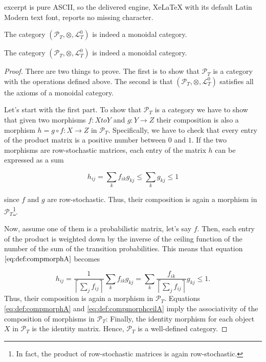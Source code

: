 \documentclass[10pt,a4paper]{amsart}
\renewcommand{\L}{\mathcal{L}}
\renewcommand{\P}{\mathcal{P}}
\begin{document}
excerpt is pure ASCII, so the delivered engine, XeLaTeX with its default Latin Modern text font, reports no missing character.
\begin{theorem}\label{thm:MonoidalCat}
	The category $(\P_{T},\otimes, \L_{T}^{0})$ is indeed a monoidal category.
\end{theorem}

	\begin{theorem}\label{thm:MonoidalCatA}
		The category $(\P_{T},\otimes, \L_{T}^{0})$ is indeed a monoidal category.
	\end{theorem}

	\begin{proof}
		There are two things to prove. The first is to show that $\P_{T}$ is a category with the operations defined above. The second is that $(\P_{T},\otimes, \L_{T}^{0})$ satisfies all the axioms of a monoidal category.
		
		Let's start with the first part. To show that $\P_{T}$ is a category we have to show that given two morphisms $f\colon X to Y$ and $g\colon Y\to Z$ their composition is also a morphism $h = g\circ f\colon X\to Z$ in $\P_{T}$. Specifically, we have to check that every entry of the product matrix is a positive number between $0$ and $1$. If the two morphisms are row-stochastic matrices, each entry of the matrix $h$ can be expressed as a sum
		
		\begin{equation}\label{eq:def:compmorphA}
			h_{ij}=\sum_{k} f_{ik}g_{kj}\leq \sum_{k} g_{kj}\leq 1
		\end{equation}
		
		since $f$ and $g$ are row-stochastic. Thus, their composition is again a morphism in $\P_{T}$\footnote{In fact, the product of row-stochastic matrices is again row-stochastic.}. 
		
		
		Now, assume one of them is a probabilistic matrix, let's say $f$. Then, each entry of the product is weighted down by the inverse of the ceiling function of the number of the sum of the transition probabilities. This means that equation $\eqref{eq:def:compmorphA}$ becomes
		
		\begin{equation}\label{eq:def:compmorphceilA}
			h_{ij}= \frac{1}{\left\lceil\sum_{j}f_{ij}\right\rceil}\sum_{k} f_{ik}g_{kj} = \sum_{k} \frac{f_{ik}}{\left\lceil\sum_{j}f_{ij}\right\rceil} g_{kj}\leq 1.
		\end{equation}
		Thus, their composition is again a morphism in $\P_{T}$. Equations \eqref{eq:def:compmorphA} and \eqref{eq:def:compmorphceilA} imply the associativity of the composition of morphisms in $\P_{T}$: Finally, the identity morphism for each object $X$ in $\P_{T}$ is the identity matrix. Hence, $\P_{T}$ is a well-defined category.
		

\end{proof}
\end{document}
